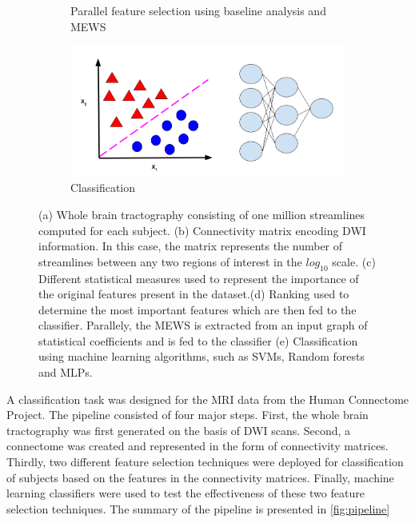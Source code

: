 \documentclass[msthesis.tex]{subfiles}
\begin{document}
\begin{figure}
\begin{subfigure}[b]{0.9\textwidth}
\begin{subfigure}[b]{0.4\textwidth}
         \label{fig:mewspip}
         \end{subfigure}
    \vspace{-2em}
     \caption{Parallel feature selection using baseline analysis and MEWS}
    \end{subfigure}
    \vfill
        \begin{subfigure}[b]{0.6\textwidth}
         \centering
         \includegraphics[height =0.4\textwidth,width=\textwidth]{images/classification.png}
         \caption{Classification}
         \label{fig:three sin x}
         \end{subfigure}
    \caption{(a) Whole brain tractography consisting of one million streamlines computed for each subject. (b) Connectivity matrix encoding DWI information. In this case, the matrix represents the number of streamlines between any two regions of interest in the $log_{10}$ scale. (c) Different statistical measures used to represent the importance of the original features present in the dataset.(d) Ranking used to determine the  most important features which are then fed to the classifier. Parallely, the MEWS is extracted from an input graph of statistical coefficients and is fed to the classifier (e) Classification using machine learning algorithms, such as SVMs, Random forests and MLPs.}    
    \label{fig:pipeline}
\end{figure}

A classification task was designed for the MRI data from the Human Connectome Project. The pipeline consisted of four major steps. First, the whole brain tractography was first generated on the basis of DWI scans. Second, a connectome was created and represented in the form of connectivity matrices. Thirdly, two different feature selection techniques were deployed for classification of subjects based on the features in the connectivity matrices. Finally, machine learning classifiers were used to test the effectiveness of these two feature selection techniques. The summary of the pipeline is presented in \autoref{fig:pipeline}
\end{document}
